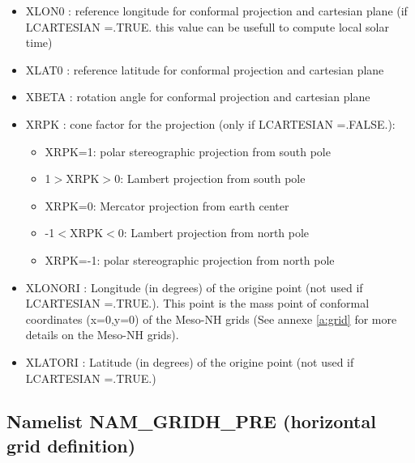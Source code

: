 \begin{itemize}          
\item  XLON0 : reference
longitude for conformal projection and cartesian plane 
(if LCARTESIAN =.TRUE. this
value can be usefull to compute local solar time)

\item XLAT0 : reference
latitude for conformal projection and cartesian plane

\item XBETA : rotation angle
for conformal projection and cartesian plane

\item XRPK : 
 cone factor for the projection (only if LCARTESIAN =.FALSE.):
\begin{itemize}
\item XRPK=1: polar stereographic projection from south pole
\item 1$>$XRPK$>$0: Lambert projection from south pole
\item XRPK=0: Mercator projection from earth center
\item -1$<$XRPK$<$0: Lambert projection from north pole
\item XRPK=-1: polar stereographic projection from north pole
\end{itemize}

\item XLONORI : Longitude (in degrees) 
of the origine point (not used if LCARTESIAN =.TRUE.). This point is the mass
point of conformal coordinates (x=0,y=0) of the Meso-NH grids (See annexe \ref{a:grid} for more details on the Meso-NH grids).

\item XLATORI  : Latitude (in degrees)
 of the origine point (not used if LCARTESIAN =.TRUE.)

\end{itemize}


  
\subsection{Namelist NAM\_GRIDH\_PRE (horizontal grid definition)}


